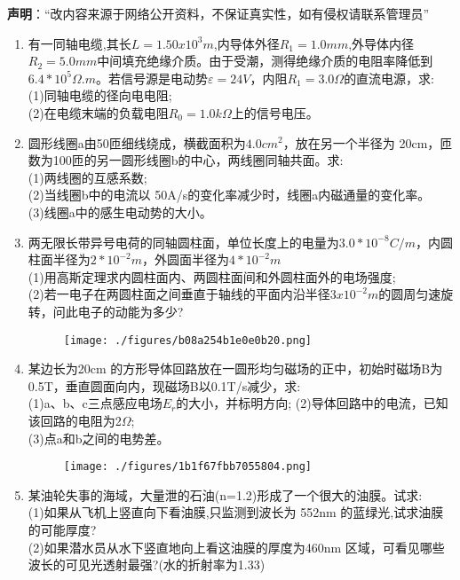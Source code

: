 
\textbf{声明}：“改内容来源于网络公开资料，不保证真实性，如有侵权请联系管理员”
\begin{enumerate}
\item 有一同轴电缆,其长$L=1.50x10^3m$,内导体外径$R_1=1.0mm$,外导体内径$R_2=5.0mm$中间填充绝缘介质。由于受潮，测得绝缘介质的电阻率降低到$6.4*10^5\Omega .m$。若信号源是电动势$\varepsilon=24V$，内阻$R_1=3.0\Omega$的直流电源，求:\\
(1)同轴电缆的径向电电阻;\\
(2)在电缆末端的负载电阻$R_0=1.0k \Omega$上的信号电压。
\item 圆形线圈a由50匝细线绕成，横截面积为$4.0cm^2$，放在另一个半径为 20cm，匝数为100匝的另一圆形线圈b的中心，两线圈同轴共面。求:\\
(1)两线圈的互感系数;\\
(2)当线圈b中的电流以 50A/s的变化率减少时，线圈a内磁通量的变化率。\\
(3)线圈a中的感生电动势的大小。
\item 两无限长带异号电荷的同轴圆柱面，单位长度上的电量为$3.0*10^{-8}C/m$，内圆柱面半径为$2*10^{-2}m$，外圆面半径为$4*10^{-2}m$\\
(1)用高斯定理求内圆柱面内、两圆柱面间和外圆柱面外的电场强度;\\
(2)若一电子在两圆柱面之间垂直于轴线的平面内沿半径$3x10^{-2}m$的圆周匀速旋转，问此电子的动能为多少?
\begin{figure}[ht]
\centering
\texttt{[image: ./figures/b08a254b1e0e0b20.png]}
\caption{} \label{fig_SD08_1}
\end{figure}
\item 某边长为20cm 的方形导体回路放在一圆形均匀磁场的正中，初始时磁场B为 0.5T，垂直圆面向内，现磁场B以0.1T/s减少，求:\\
(1)a、b、c三点感应电场$E_r$的大小，并标明方向;
(2)导体回路中的电流，已知该回路的电阻为2$\Omega$;\\
(3)点a和b之间的电势差。
\begin{figure}[ht]
\centering
\texttt{[image: ./figures/1b1f67fbb7055804.png]}
\caption{} \label{fig_SD08_2}
\end{figure}
\item 某油轮失事的海域，大量泄的石油(n=1.2)形成了一个很大的油膜。试求:\\
(1)如果从飞机上竖直向下看油膜,只监测到波长为 552nm 的蓝绿光,试求油膜的可能厚度?\\
(2)如果潜水员从水下竖直地向上看这油膜的厚度为460nm 区域，可看见哪些波长的可见光透射最强?(水的折射率为1.33)

\end{enumerate}
